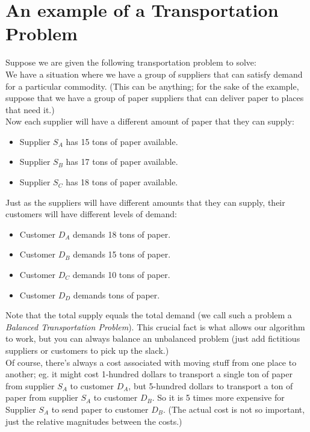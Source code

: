 \documentclass[a4paper,12pt]{article}
\begin{document}
\newpage

\section*{An example of a Transportation Problem}
Suppose we are given the following transportation problem to solve:\\

We have a situation where we have a group of suppliers that can satisfy demand for a particular commodity. (This can be anything; for the sake of the example, suppose that we have a group of paper suppliers that can deliver paper to places that need it.)\\

Now each supplier will have a different amount of paper that they can supply:
\begin{itemize}
\item
Supplier $S_A$ has 15 tons of paper available.
\item
Supplier $S_B$ has 17 tons of paper available.

\item
Supplier $S_C$ has 18 tons of paper available.\\
\end{itemize}

Just as the suppliers will have different amounts that they can supply, their customers will have different levels of demand:
\begin{itemize}
\item
Customer $D_A$ demands 18 tons of paper. 

\item
Customer $D_B$ demands 15 tons of paper.

\item
Customer $D_C$ demands 10 tons of paper.

\item
Customer $D_D$ demands \; tons of paper.

\end{itemize}

Note that the total supply equals the total demand (we call such a problem a \textit{Balanced Transportation Problem}). This crucial fact is what allows our algorithm to work, but you can always balance an unbalanced problem (just add fictitious suppliers or customers to pick up the slack.) \\

Of course, there's always a cost associated with moving stuff from one place to another; eg. it might cost 1-hundred dollars to transport a single ton of paper from supplier $S_A$ to customer $D_A$, but 5-hundred dollars to transport a ton of paper from supplier $S_A$ to customer $D_B$. So it is 5 times more expensive for Supplier $S_A$ to send paper to customer $D_B$. (The actual cost is not so important, just the relative magnitudes between the costs.)\\
\end{document}
